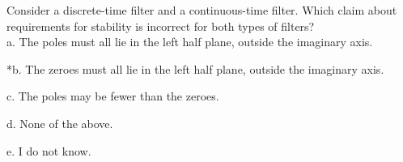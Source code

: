 
Consider a discrete-time filter and a continuous-time filter. Which claim about requirements for stability is incorrect for both types of filters? \\

a. The poles must all lie in the left half plane, outside the imaginary axis.

*b. The zeroes must all lie in the left half plane, outside the imaginary axis.

c. The poles may be fewer than the zeroes.

d. None of the above.

e. I do not know. \\
